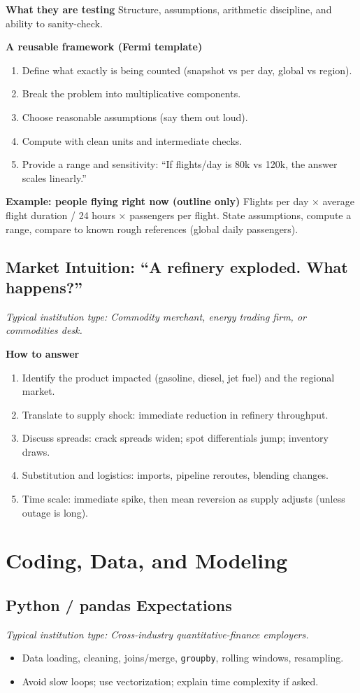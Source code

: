 \documentclass[11pt,letterpaper,openany]{book}
\newcommand{\RoleProfile}[2]{%
  \subsection{#1}%
  \noindent\textit{Typical institution type: #2.}\par
}
\begin{document}
\textbf{What they are testing}
Structure, assumptions, arithmetic discipline, and ability to sanity-check.

\textbf{A reusable framework (Fermi template)}
\begin{enumerate}
  \item Define what exactly is being counted (snapshot vs per day, global vs region).
  \item Break the problem into multiplicative components.
  \item Choose reasonable assumptions (say them out loud).
  \item Compute with clean units and intermediate checks.
  \item Provide a range and sensitivity: ``If flights/day is 80k vs 120k, the answer scales linearly.''
\end{enumerate}

\textbf{Example: people flying right now (outline only)}
Flights per day $\times$ average flight duration / 24 hours $\times$ passengers per flight. State assumptions, compute a range, compare to known rough references (global daily passengers).

\RoleProfile{Market Intuition: ``A refinery exploded. What happens?''}{Commodity merchant, energy trading firm, or commodities desk}
\textbf{How to answer}
\begin{enumerate}
  \item Identify the product impacted (gasoline, diesel, jet fuel) and the regional market.
  \item Translate to supply shock: immediate reduction in refinery throughput.
  \item Discuss spreads: crack spreads widen; spot differentials jump; inventory draws.
  \item Substitution and logistics: imports, pipeline reroutes, blending changes.
  \item Time scale: immediate spike, then mean reversion as supply adjusts (unless outage is long).
\end{enumerate}

\section{Coding, Data, and Modeling}

\RoleProfile{Python / pandas Expectations}{Cross-industry quantitative-finance employers}
\begin{itemize}
  \item Data loading, cleaning, joins/merge, \texttt{groupby}, rolling windows, resampling.
  \item Avoid slow loops; use vectorization; explain time complexity if asked.
\end{itemize}
\end{document}
